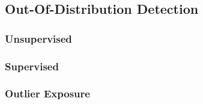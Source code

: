 \subsection{Out-Of-Distribution Detection}
\label{section: Out-Of-Distribution Detection}
\subsubsection{Unsupervised}
\subsubsection{Supervised}
\subsubsection{Outlier Exposure}
